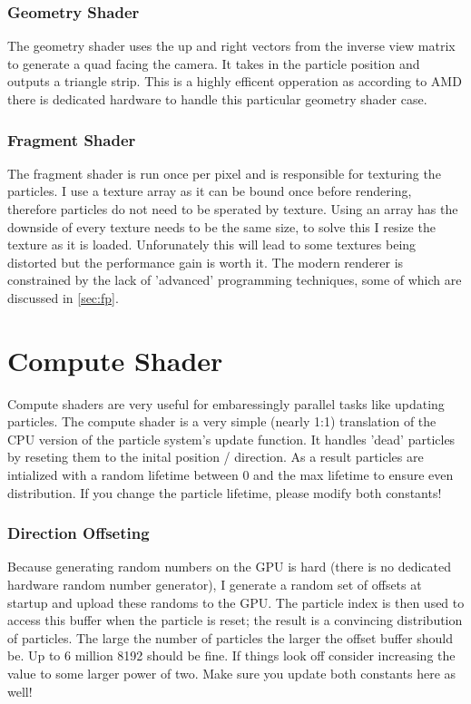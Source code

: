 \documentclass[]{report}
\begin{document}
\subsubsection{Geometry Shader}
The geometry shader uses the up and right vectors from the inverse view matrix to generate a quad facing the camera. It takes in the particle position and outputs a triangle strip. This is a highly efficent opperation as according to AMD there is dedicated hardware to handle this particular geometry shader case\cite[p.~9]{amdprogram}. 
\subsubsection{Fragment Shader}
The fragment shader is run once per pixel and is responsible for texturing the particles. I use a texture array as it can be bound once before rendering, therefore particles do not need to be sperated by texture. Using an array has the downside of every texture needs to be the same size, to solve this I resize the texture as it is loaded. Unforunately this will lead to some textures being distorted but the performance gain is worth it. The modern renderer is constrained by the lack of 'advanced' programming techniques, some of which are discussed in \autoref{sec:fp}.
\section{Compute Shader}
Compute shaders are very useful for embaressingly parallel tasks like updating particles. The compute shader is a very simple (nearly 1:1) translation of the CPU version of the particle system's update function. It handles 'dead' particles by reseting them to the inital position / direction. As a result particles are intialized with a random lifetime between 0 and the max lifetime to ensure even distribution. If you change the particle lifetime, please modify both constants! 
\subsubsection{Direction Offseting}
Because generating random numbers on the GPU is hard (there is no dedicated hardware random number generator), I generate a random set of offsets at startup and upload these randoms to the GPU. The particle index is then used to access this buffer when the particle is reset; the result is a convincing distribution of particles. The large the number of particles the larger the offset buffer should be. Up to 6 million 8192 should be fine. If things look off consider increasing the value to some larger power of two. Make sure you update both constants here as well!
\end{document}
